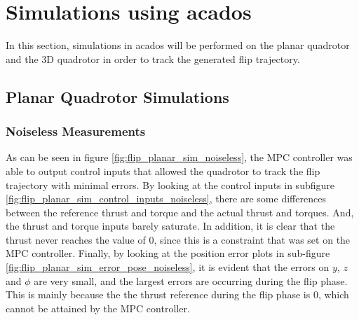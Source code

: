 \documentclass{thesisreport}
\begin{document}
\newpage

\section{Simulations using acados}

In this section, simulations in acados will be performed on the planar quadrotor and the 3D quadrotor in order to track the generated flip trajectory.

\subsection{Planar Quadrotor Simulations}

\subsubsection*{Noiseless Measurements}

As can be seen in figure \ref{fig:flip_planar_sim_noiseless}, the MPC controller was able to output control inputs that allowed the quadrotor to track the flip trajectory with minimal errors. By looking at the control inputs in subfigure \ref{fig:flip_planar_sim_control_inputs_noiseless}, there are some differences between the reference thrust and torque and the actual thrust and torques. And, the thrust and torque inputs barely saturate. In addition, it is clear that the thrust never reaches the value of 0, since this is a constraint that was set on the MPC controller. Finally, by looking at the position error plots in sub-figure \ref{fig:flip_planar_sim_error_pose_noiseless}, it is evident that the errors on $y$, $z$ and $\phi$ are very small, and the largest errors are occurring during the flip phase. This is mainly because the the thrust reference during the flip phase is 0, which cannot be attained by the MPC controller.
\end{document}
